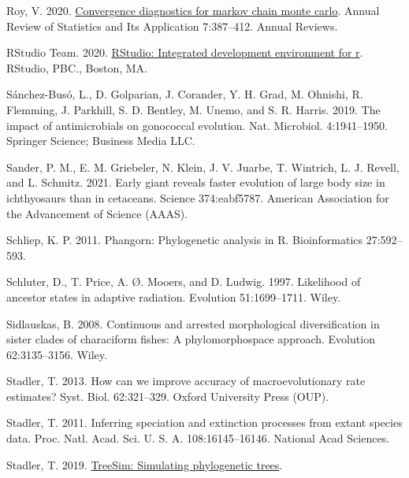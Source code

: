 \documentclass[fleqn,10pt,lineno]{wlpeerj} %
\newlength{\cslhangindent}
\newlength{\cslentryspacingunit} %
\newenvironment{CSLReferences}[2] %
 {%
  \setlength{\parindent}{0pt}
  \ifodd #1
  \let\oldpar\par
  \def\par{\hangindent=\cslhangindent\oldpar}
  \fi
  \setlength{\parskip}{#2\cslentryspacingunit}
 }%
 {}
\begin{document}
\begin{CSLReferences}{1}{0}
\leavevmode{}%
Roy, V. 2020. \href{https://doi.org/10.1146/annurev-statistics-031219-041300}{Convergence diagnostics for markov chain monte carlo}. Annual Review of Statistics and Its Application 7:387--412. Annual Reviews.

\leavevmode{}%
RStudio Team. 2020. \href{http://www.rstudio.com/}{RStudio: Integrated development environment for r}. RStudio, PBC., Boston, MA.

\leavevmode{}%
Sánchez-Busó, L., D. Golparian, J. Corander, Y. H. Grad, M. Ohnishi, R. Flemming, J. Parkhill, S. D. Bentley, M. Unemo, and S. R. Harris. 2019. The impact of antimicrobials on gonococcal evolution. Nat. Microbiol. 4:1941--1950. Springer Science; Business Media LLC.

\leavevmode{}%
Sander, P. M., E. M. Griebeler, N. Klein, J. V. Juarbe, T. Wintrich, L. J. Revell, and L. Schmitz. 2021. Early giant reveals faster evolution of large body size in ichthyosaurs than in cetaceans. Science 374:eabf5787. American Association for the Advancement of Science (AAAS).

\leavevmode{}%
Schliep, K. P. 2011. Phangorn: Phylogenetic analysis in {R}. Bioinformatics 27:592--593.

\leavevmode{}%
Schluter, D., T. Price, A. Ø. Mooers, and D. Ludwig. 1997. Likelihood of ancestor states in adaptive radiation. Evolution 51:1699--1711. Wiley.

\leavevmode{}%
Sidlauskas, B. 2008. Continuous and arrested morphological diversification in sister clades of characiform fishes: A phylomorphospace approach. Evolution 62:3135--3156. Wiley.

\leavevmode{}%
Stadler, T. 2013. How can we improve accuracy of macroevolutionary rate estimates? Syst. Biol. 62:321--329. Oxford University Press (OUP).

\leavevmode{}%
Stadler, T. 2011. Inferring speciation and extinction processes from extant species data. Proc. Natl. Acad. Sci. U. S. A. 108:16145--16146. National Acad Sciences.

\leavevmode{}%
Stadler, T. 2019. \href{https://CRAN.R-project.org/package=TreeSim}{TreeSim: Simulating phylogenetic trees}.


\end{CSLReferences}
\end{document}
